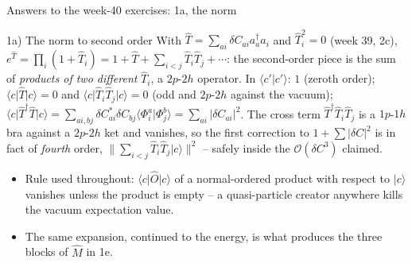 \documentclass[aspectratio=169,10pt]{beamer}
\newcommand{\ket}[1]{\vert #1\rangle}
\newcommand{\braket}[2]{\langle #1\vert #2\rangle}
\newcommand{\element}[3]{\langle #1\vert #2\vert #3\rangle}
\newcommand{\bigO}{\mathcal{O}}
\begin{document}
\begin{frame}{Answers to the week-40 exercises: 1a, the norm}
  \footnotesize
  \begin{block}{1a) The norm to second order}
    With $\hat T=\sum_{ai}\delta C_{ai}a_a^{\dagger}a_i$ and $\hat T_i^2=0$ (week 39, 2c), $e^{\hat T}=\prod_i(1+\hat T_i)=1+\hat T+\sum_{i<j}\hat T_i\hat T_j+\cdots$:
    the second-order piece is the sum of \emph{products of two different} $\hat T_i$, a $2p$-$2h$ operator. In $\braket{c'}{c'}$: $1$ (zeroth order); $\element{c}{\hat T}{c}=0$ and $\element{c}{\hat T_i\hat T_j}{c}=0$ (odd and $2p$-$2h$ against the vacuum); $\element{c}{\hat T^{\dagger}\hat T}{c}=\sum_{ai,bj}\delta C^{*}_{ai}\delta C_{bj}\braket{\Phi_i^a}{\Phi_j^b}=\sum_{ai}|\delta C_{ai}|^2$.
    The cross term $\hat T^{\dagger}\hat T_i\hat T_j$ is a $1p$-$1h$ bra against a $2p$-$2h$ ket and vanishes, so the first correction to $1+\sum|\delta C|^2$ is in fact of \emph{fourth} order, $\|\sum_{i<j}\hat T_i\hat T_j\ket c\|^2$ -- safely inside the $\bigO(\delta C^3)$ claimed.
  \end{block}
  \vspace{0.3em}
  \begin{itemize}
    \item Rule used throughout: $\element{c}{\hat O}{c}$ of a normal-ordered product with respect to $\ket c$ vanishes unless the product is empty -- a quasi-particle creator anywhere kills the vacuum expectation value.
    \item The same expansion, continued to the energy, is what produces the three blocks of $\hat M$ in 1e.
  \end{itemize}
\end{frame}
\end{document}
